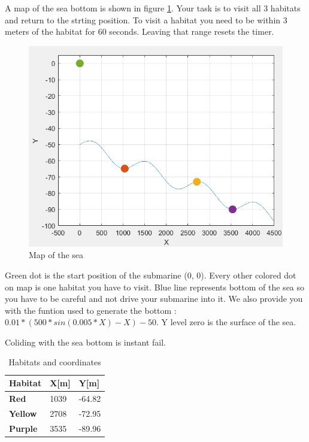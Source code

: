 \documentclass{article}
\begin{document}
A map of the sea bottom is shown in figure \ref{fig:map}. Your task is to visit all 3 habitats and return to the strting position. To visit a habitat you need to be within 3 meters of the habitat for 60 seconds.
Leaving that range resets the timer.

\begin{figure}[!htb]
	\centering
	\includegraphics{Images/path.PNG}
	\caption{Map of the sea}
	\label{fig:map}
\end{figure}

Green dot is the start position of the submarine (0, 0). Every other colored dot on map is one habitat you have to visit. Blue line represents bottom of the sea so you have to be careful and not drive your submarine into it. We also provide you with the funtion used to generate the bottom : $0.01*(500*sin(0.005*X)-X) - 50$. Y level zero is the surface of the sea. 

Coliding with the sea bottom is instant fail.

\begin{table}[h!]
	\caption{Habitats and coordinates}
	\label{tab:nominalValues}
	\begin{tabularx}{\textwidth}{|Y|Y|Y|} \hline
		\textbf{Habitat} & X[m] & Y[m] \\ \hline 
		\textbf{Red} & 1039   & -64.82\\ \hline 
		\textbf{Yellow} & 2708  & -72.95\\ \hline
		\textbf{Purple} & 3535  &  -89.96\\ \hline
	\end{tabularx}
\end{table}
\end{document}
